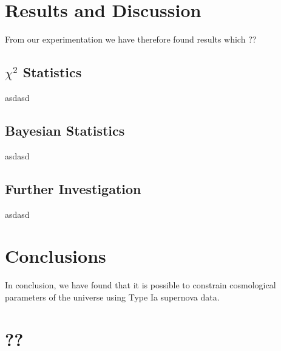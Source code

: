 \documentclass[twocolumn]{revtex4}
\begin{document}
\section{Results and Discussion} 
\label{sec:results_discussion}
\vspace{-2ex}
From our experimentation we have therefore found results which ??

\vspace{-3ex}
\subsection{$\chi^2$ Statistics} 
\vspace{-2ex}

asdasd

\vspace{-3ex}
\subsection{Bayesian Statistics} 
\vspace{-2ex}

asdasd

\vspace{-3ex}
\subsection{Further Investigation} 
\vspace{-2ex}

asdasd

\vspace{-5ex}
\section{Conclusions}
\vspace{-2ex}

In conclusion, we have found that it is possible to constrain cosmological parameters of the universe using Type Ia supernova data.

\vspace{-3ex}



\clearpage
\appendix

\vfill
\twocolumngrid
\vspace{-3ex}
\section{??}
\vspace{-2ex}



\clearpage
\end{document}
